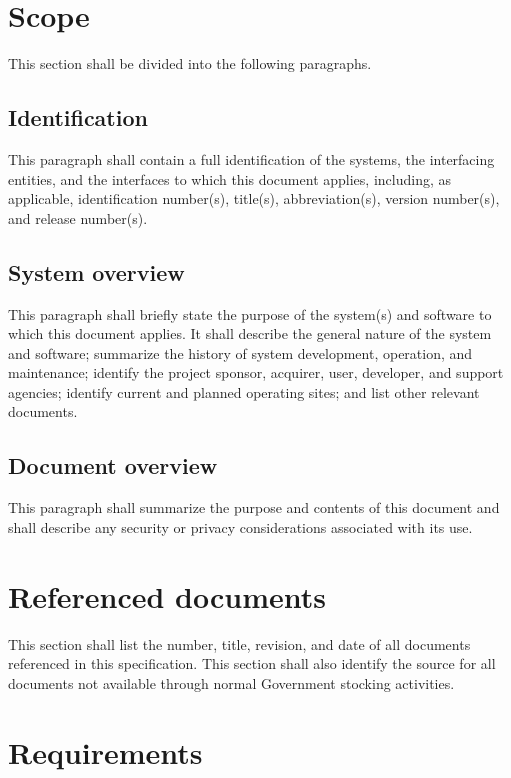 \documentclass{fidata-report-template}
\begin{document}
\section{Scope}

This section shall be divided into the following paragraphs.

\subsection{Identification}

This paragraph shall contain a full identification of the systems, the
interfacing entities, and the interfaces to which this document applies,
including, as applicable, identification number(s), title(s),
abbreviation(s), version number(s), and release number(s).

\subsection{System overview}

This paragraph shall briefly state the purpose of the system(s) and
software to which this document applies. It shall describe the general
nature of the system and software; summarize the history of system
development, operation, and maintenance; identify the project sponsor,
acquirer, user, developer, and support agencies; identify current and
planned operating sites; and list other relevant documents.

\subsection{Document overview}

This paragraph shall summarize the purpose and contents of this document
and shall describe any security or privacy considerations associated
with its use.

\section{Referenced documents}

This section shall list the number, title, revision, and date of all
documents referenced in this specification. This section shall also
identify the source for all documents not available through normal
Government stocking activities.

\section{Requirements}
\end{document}
